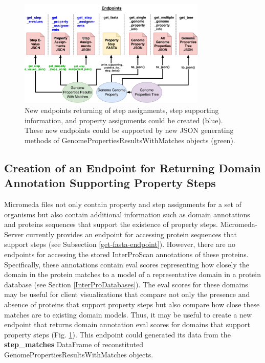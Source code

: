 \begin{figure}[!ht]
  \centering
	\includegraphics[width=0.8\textwidth]{media/micromeda-server-new-endpoints.pdf}
	 \caption{New endpoints returning of step assignments, step supporting information, and property assignments could be created (blue). These new endpoints could be supported by new JSON generating methods of GenomePropertiesResultsWithMatches objects (green).}
	 \label{fig:new_endpoints}
\end{figure}

\subsection{Creation of an Endpoint for Returning Domain Annotation Supporting Property Steps} \label{e-value-endpoint}

Micromeda files not only contain property and step assignments for a set of organisms but also contain additional information such as domain annotations and proteins sequences that support the existence of property steps. Micromeda-Server currently provides an endpoint for accessing protein sequences that support steps (see Subsection \ref{get-fasta-endpoint}). However, there are no endpoints for accessing the stored InterProScan annotations of these proteins. Specifically, these annotations contain \gls{eval} scores representing how closely the domain in the protein matches to a model of a representative domain in a protein database (see Section \ref{InterProDatabases}). The \gls{eval} scores for these domains may be useful for client visualizations that compare not only the presence and absence of proteins that support property steps but also compare how close these matches are to existing domain models. Thus, it may be useful to create a new endpoint that returns domain annotation \gls{eval} scores for domains that support property steps (Fig. \ref{fig:new_endpoints}). This endpoint could generated its data from the \textbf{step\_matches} DataFrame of reconstituted GenomePropertiesResultsWithMatches objects.

